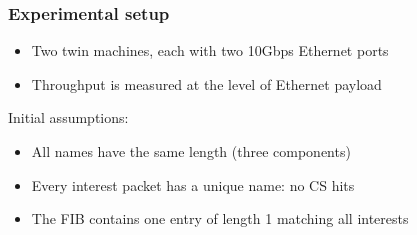 \begin{frame}[fragile]
  \frametitle{Experimental setup}
  \begin{itemize}
    \item Two twin machines, each with two 10Gbps Ethernet ports
    \item Throughput is measured at the level of Ethernet payload
  \end{itemize}
  Initial assumptions:
  \begin{itemize}
    \item All names have the same length (three components)
    \item Every interest packet has a unique name: no CS hits
    \item The FIB contains one entry of length 1 matching all interests
  \end{itemize}
  \vspace{.5em}
  \begin{columns}
    \resizebox{\linewidth}{!}{%
      
    }
  \end{columns}
\end{frame}


